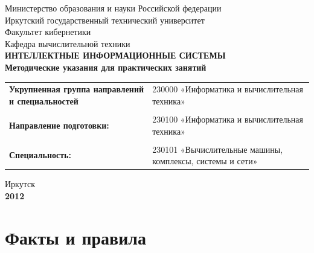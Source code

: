 \documentclass[12pt, openany, oneside]{book} %
\begin{document}
\def\chaptername{Лабораторная работа}
\def\thechapter{\arabic{chapter}}
\def\thefigure{\arabic{section}.\arabic{figure}}
\def\thetable{\arabic{section}.\arabic{table}}
\fancyhf{} %

\begin{titlepage}
\thispagestyle{empty}
\begin{center}
Министерство образования и науки
Российской федерации\\
{\sc Иркутский государственный технический университет}\\
{\sc Факультет кибернетики \\
Кафедра вычислительной техники
}\\[0.5em]

\vfill
 \vfill
{\large\bf ИНТЕЛЛЕКТНЫЕ ИНФОРМАЦИОННЫЕ СИСТЕМЫ \\[0.5em]
Методические указания для практических занятий} \\
\vfill
\begin{center}
\begin{tabular}{p{5.5cm}p{9cm}}
 \textbf{Укрупненная группа направлений и специальностей} & 230000 «Информатика и вычислительная техника»
 \\
 & \\
 \textbf{Направление подготовки:} & 230100 «Информатика и вычислительная техника»
 \\
 & \\
 \textbf{Специальность:} & 230101 «Вычислительные машины, комплексы, системы и сети»
 \\
\end{tabular}
\end{center}



\vfill
\vfill
 Иркутск\\
 {\bf 2012}
\end{center}
\end{titlepage}


\chapter{Факты и правила}
\end{document}
